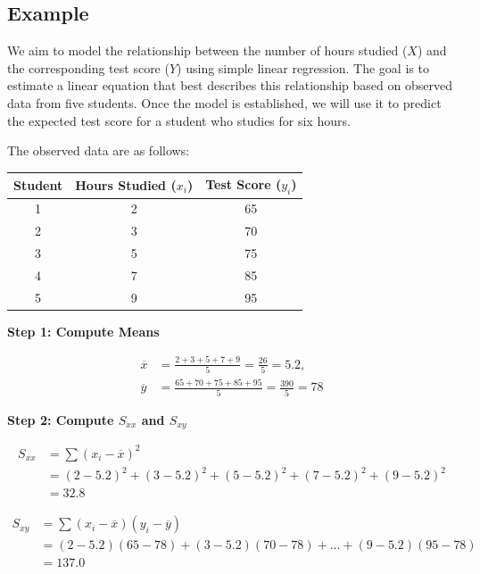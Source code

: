 \documentclass[twoside]{book}
\begin{document}
\subsection{Example}

We aim to model the relationship between the number of hours studied (\(X\)) and the corresponding test score (\(Y\)) using simple linear regression. The goal is to estimate a linear equation that best describes this relationship based on observed data from five students. Once the model is established, we will use it to predict the expected test score for a student who studies for six hours.

The observed data are as follows:

\begin{center}
\begin{tabular}{c|c|c}
\toprule
\textbf{Student} & \textbf{Hours Studied} (\(x_i\)) & \textbf{Test Score} (\(y_i\)) \\
\midrule
1 & 2 & 65 \\
2 & 3 & 70 \\
3 & 5 & 75 \\
4 & 7 & 85 \\
5 & 9 & 95 \\
\bottomrule
\end{tabular}
\end{center}

\textbf{Step 1: Compute Means}

\begin{align*}
    \overline{x} &= \frac{2 + 3 + 5 + 7 + 9}{5} = \frac{26}{5} = 5.2, \\
\overline{y} &= \frac{65 + 70 + 75 + 85 + 95}{5} = \frac{390}{5} = 78
\end{align*}

\textbf{Step 2: Compute $S_{xx}$ and $S_{xy}$}

\begin{align*}
    S_{xx} &= \sum (x_i - \overline{x})^2 \\
    &= (2 - 5.2)^2 + (3 - 5.2)^2 + (5 - 5.2)^2 + (7 - 5.2)^2 + (9 - 5.2)^2 \\
    &= 32.8
\end{align*}

\begin{align*}
    S_{xy} &= \sum (x_i - \overline{x})(y_i - \overline{y}) \\
    &= (2 - 5.2)(65 - 78) + (3 - 5.2)(70 - 78) + \ldots + (9 - 5.2)(95 - 78) \\
    &= 137.0
\end{align*}
\end{document}
